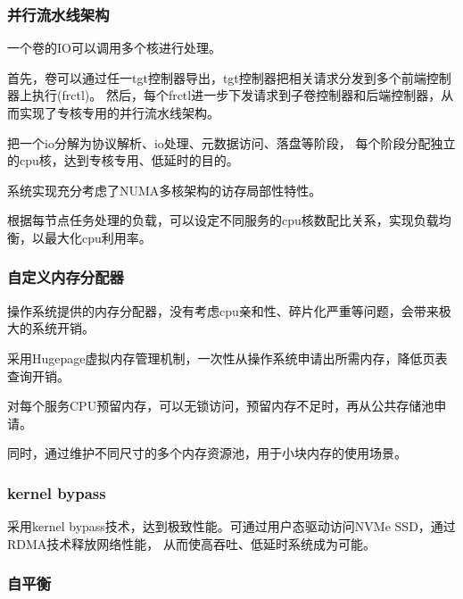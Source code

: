 \subsubsection{并行流水线架构}


一个卷的IO可以调用多个核进行处理。

首先，卷可以通过任一tgt控制器导出，tgt控制器把相关请求分发到多个前端控制器上执行(frctl)。
然后，每个frctl进一步下发请求到子卷控制器和后端控制器，从而实现了专核专用的并行流水线架构。


把一个io分解为协议解析、io处理、元数据访问、落盘等阶段，
每个阶段分配独立的cpu核，达到专核专用、低延时的目的。

系统实现充分考虑了NUMA多核架构的访存局部性特性。

根据每节点任务处理的负载，可以设定不同服务的cpu核数配比关系，实现负载均衡，以最大化cpu利用率。

\subsubsection{自定义内存分配器}

操作系统提供的内存分配器，没有考虑cpu亲和性、碎片化严重等问题，会带来极大的系统开销。

采用Hugepage虚拟内存管理机制，一次性从操作系统申请出所需内存，降低页表查询开销。

对每个服务CPU预留内存，可以无锁访问，预留内存不足时，再从公共存储池申请。

同时，通过维护不同尺寸的多个内存资源池，用于小块内存的使用场景。


\subsubsection{kernel bypass}

采用kernel bypass技术，达到极致性能。可通过用户态驱动访问NVMe SSD，通过RDMA技术释放网络性能，
从而使高吞吐、低延时系统成为可能。

\subsubsection{自平衡}

